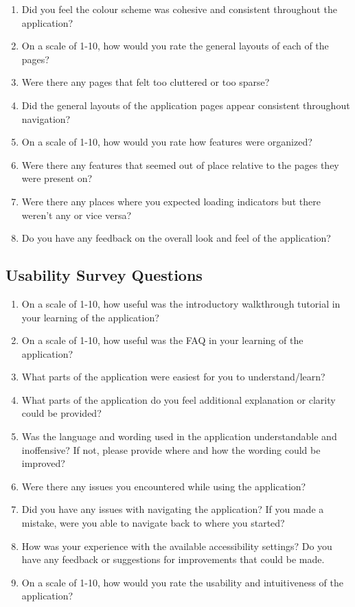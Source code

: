 \documentclass[12pt, titlepage]{article}
\begin{document}
\begin{enumerate}
  \item Did you feel the colour scheme was cohesive and consistent throughout the application?
  \item On a scale of 1-10, how would you rate the general layouts of each of the pages?
  \item Were there any pages that felt too cluttered or too sparse?
  \item Did the general layouts of the application pages appear consistent throughout navigation?
  \item On a scale of 1-10, how would you rate how features were organized?
  \item Were there any features that seemed out of place relative to the pages they were present on?
  \item Were there any places where you expected loading indicators but there weren't any or vice versa?
  \item Do you have any feedback on the overall look and feel of the application?
\end{enumerate}

\subsection{Usability Survey Questions}

\begin{enumerate}
  \item On a scale of 1-10, how useful was the introductory walkthrough tutorial in your learning of the application?
  \item On a scale of 1-10, how useful was the FAQ in your learning of the application?
  \item What parts of the application were easiest for you to understand/learn?
  \item What parts of the application do you feel additional explanation or clarity could be provided?
  \item Was the language and wording used in the application understandable and inoffensive? If not, please
  provide where and how the wording could be improved?
  \item Were there any issues you encountered while using the application?
  \item Did you have any issues with navigating the application? If you made a mistake, were you able to navigate
  back to where you started?
  \item How was your experience with the available accessibility settings? Do you have any feedback or suggestions for
  improvements that could be made.
  \item On a scale of 1-10, how would you rate the usability and intuitiveness of the application?
\end{enumerate}
\end{document}
